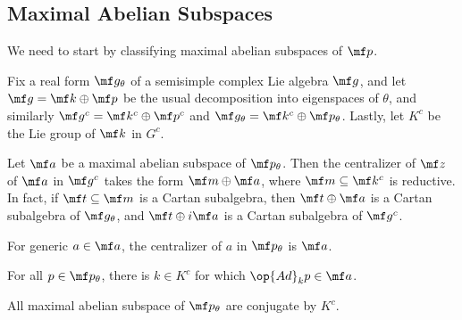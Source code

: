\documentclass[../notes.tex]{subfiles}
\begin{document}
\subsection{Maximal Abelian Subspaces}
We need to start by classifying maximal abelian subspaces of $\mf p$.
\begin{proposition} \label{prop:maximal-abelian-subspace}
	Fix a real form $\mf g_\theta$ of a semisimple complex Lie algebra $\mf g$, and let $\mf g=\mf k\oplus\mf p$ be the usual decomposition into eigenspaces of $\theta$, and similarly $\mf g^c=\mf k^c\oplus\mf p^c$ and $\mf g_\theta=\mf k^c\oplus\mf p_\theta$. Lastly, let $K^c$ be the Lie group of $\mf k$ in $G^c$.
	\begin{listalph}
		\item Let $\mf a$ be a maximal abelian subspace of $\mf p_\theta$. Then the centralizer of $\mf z$ of $\mf a$ in $\mf g^c$ takes the form $\mf m\oplus\mf a$, where $\mf m\subseteq\mf k^c$ is reductive. In fact, if $\mf t\subseteq\mf m$ is a Cartan subalgebra, then $\mf t\oplus\mf a$ is a Cartan subalgebra of $\mf g_\theta$, and $\mf t\oplus i\mf a$ is a Cartan subalgebra of $\mf g^c$.
		\item For generic $a\in\mf a$, the centralizer of $a$ in $\mf p_\theta$ is $\mf a$.
		\item For all $p\in\mf p_\theta$, there is $k\in K^c$ for which $\op{Ad}_kp\in\mf a$.
		\item All maximal abelian subspace of $\mf p_\theta$ are conjugate by $K^c$.
	\end{listalph}
\end{proposition}
\end{document}
